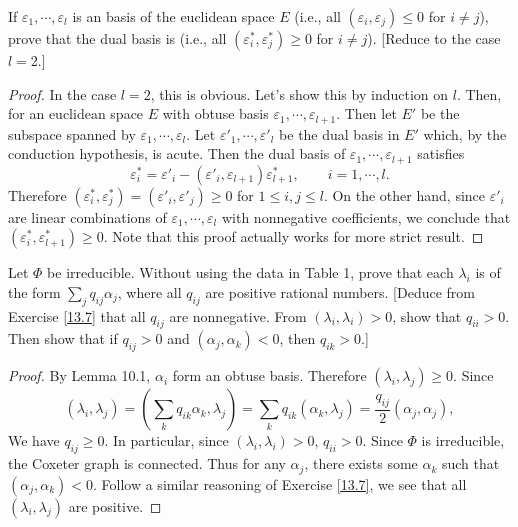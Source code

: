 \begin{ex}\label{13.7}
  If $\varepsilon_1, \cdots, \varepsilon_l$ is an  basis of the euclidean space $E$ (i.e., all $(\varepsilon_i, \varepsilon_j) \leqslant 0$ for $i \neq j$), prove that the dual basis is  (i.e., all $(\varepsilon^{\ast}_i, \varepsilon^{\ast}_j) \geqslant 0$ for $i \neq j$). [Reduce to the case $l = 2$.]
\end{ex}
\begin{proof}
	In the case $l=2$, this is obvious. Let's show this by induction on $l$. Then, for an euclidean space $E$ with obtuse basis $\varepsilon_1, \cdots, \varepsilon_{l+1}$. Then let $E'$ be the subspace spanned by $\varepsilon_1, \cdots, \varepsilon_l$. Let $\varepsilon'_1, \cdots, \varepsilon'_l$ be the dual basis in $E'$ which, by the conduction hypothesis, is acute. Then the dual basis of $\varepsilon_1, \cdots, \varepsilon_{l+1}$ satisfies
	\[\varepsilon^{\ast}_i = \varepsilon'_i - (\varepsilon'_i,\varepsilon_{l+1})\varepsilon^{\ast}_{l+1},\qquad i=1,\cdots,l.\]
	Therefore $(\varepsilon^{\ast}_i,\varepsilon^{\ast}_j) = (\varepsilon'_i,\varepsilon'_j)\geqslant0$ for $1\leqslant i,j \leqslant l$. On the other hand, since $\varepsilon'_i$ are linear combinations of $\varepsilon_1, \cdots, \varepsilon_l$ with nonnegative coefficients, we conclude that $(\varepsilon^{\ast}_i,\varepsilon^{\ast}_{l+1}) \geqslant0$. Note that this proof actually works for more strict result.
\end{proof}

\begin{ex}
  Let $\Phi$ be irreducible. Without using the data in Table 1, prove that each $\lambda_i$ is of the form $\sum \limits_j q_{ij}\alpha_j$, where all $q_{ij}$ are positive rational numbers. [Deduce from Exercise \ref{13.7} that all $q_{ij}$ are nonnegative. From $(\lambda_i, \lambda_i) > 0$, show that $q_{ii}>0$. Then show that if $q_{ij} > 0$ and $(\alpha_j, \alpha_k) < 0$, then $q_{ik} > 0$.]
\end{ex}
\begin{proof}
	By Lemma 10.1, $\alpha_i$ form an obtuse basis. Therefore $(\lambda_i, \lambda_j) \geqslant 0$. Since
	\[
	(\lambda_i, \lambda_j) = (\sum_k q_{ik}\alpha_k, \lambda_j) = \sum_{k}q_{ik} (\alpha_k,\lambda_j) = \frac{q_{ij}}{2}(\alpha_j,\alpha_j),
	\]
	We have $q_{ij}\geqslant 0$. In particular, since $(\lambda_i, \lambda_i) > 0$, $q_{ii}>0$. Since $\Phi$ is irreducible, the Coxeter graph is connected. Thus for any $\alpha_j$, there exists some $\alpha_k$ such that $(\alpha_j, \alpha_k) < 0$. Follow a similar reasoning of Exercise \ref{13.7}, we see that all $(\lambda_i, \lambda_j)$ are positive. 
\end{proof}

